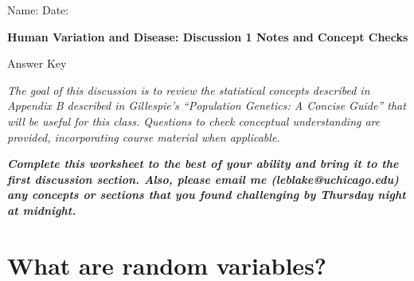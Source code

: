 \documentclass[12pt]{report}
\begin{document}
Name: \hrulefill
Date: \hrulefill

\begin{center}


\color{black}
\bigskip
\large{\textbf{Human Variation and Disease: Discussion 1 Notes and Concept Checks}}

\bigskip

\color{red} Answer Key

\color{black}

\bigskip
\normalsize{\textit{The goal of this discussion is to review the statistical concepts described in Appendix B described in Gillespie's ``Population Genetics: A Concise Guide'' that will be useful for this class. Questions to check conceptual understanding are provided, incorporating course material when applicable.}}

\bigskip
\normalsize{\textbf{\textit{Complete this worksheet to the best of your ability and bring it to the first discussion section. Also, please email me (leblake@uchicago.edu) any concepts or sections that you found challenging by Thursday night at midnight. }}}

\end{center}

\section{What are random variables?}
\end{document}
